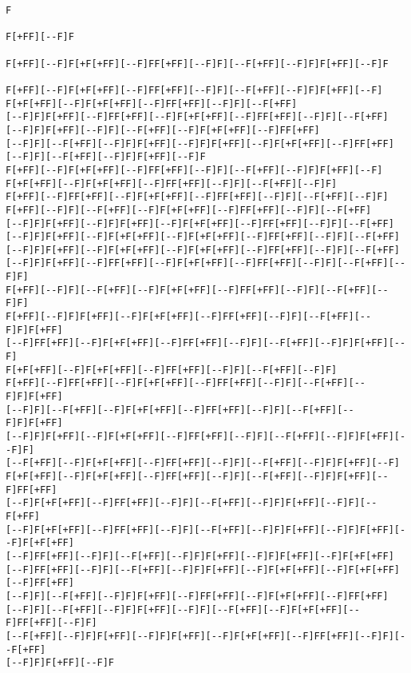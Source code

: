 \documentclass[
]{article}
\begin{document}
\begin{verbatim}
F

F[+FF][--F]F

F[+FF][--F]F[+F[+FF][--F]FF[+FF][--F]F][--F[+FF][--F]F]F[+FF][--F]F

F[+FF][--F]F[+F[+FF][--F]FF[+FF][--F]F][--F[+FF][--F]F]F[+FF][--F]
F[+F[+FF][--F]F[+F[+FF][--F]FF[+FF][--F]F][--F[+FF] 
[--F]F]F[+FF][--F]FF[+FF][--F]F[+F[+FF][--F]FF[+FF][--F]F][--F[+FF]
[--F]F]F[+FF][--F]F][--F[+FF][--F]F[+F[+FF][--F]FF[+FF]
[--F]F][--F[+FF][--F]F]F[+FF][--F]F]F[+FF][--F]F[+F[+FF][--F]FF[+FF]
[--F]F][--F[+FF][--F]F]F[+FF][--F]F 
F[+FF][--F]F[+F[+FF][--F]FF[+FF][--F]F][--F[+FF][--F]F]F[+FF][--F]
F[+F[+FF][--F]F[+F[+FF][--F]FF[+FF][--F]F][--F[+FF][--F]F] 
F[+FF][--F]FF[+FF][--F]F[+F[+FF][--F]FF[+FF][--F]F][--F[+FF][--F]F]
F[+FF][--F]F][--F[+FF][--F]F[+F[+FF][--F]FF[+FF][--F]F][--F[+FF] 
[--F]F]F[+FF][--F]F]F[+FF][--F]F[+F[+FF][--F]FF[+FF][--F]F][--F[+FF]
[--F]F]F[+FF][--F]F[+F[+FF][--F]F[+F[+FF][--F]FF[+FF][--F]F][--F[+FF] 
[--F]F]F[+FF][--F]F[+F[+FF][--F]F[+F[+FF][--F]FF[+FF][--F]F][--F[+FF]
[--F]F]F[+FF][--F]FF[+FF][--F]F[+F[+FF][--F]FF[+FF][--F]F][--F[+FF][--F]F] 
F[+FF][--F]F][--F[+FF][--F]F[+F[+FF][--F]FF[+FF][--F]F][--F[+FF][--F]F]
F[+FF][--F]F]F[+FF][--F]F[+F[+FF][--F]FF[+FF][--F]F][--F[+FF][--F]F]F[+FF] 
[--F]FF[+FF][--F]F[+F[+FF][--F]FF[+FF][--F]F][--F[+FF][--F]F]F[+FF][--F]
F[+F[+FF][--F]F[+F[+FF][--F]FF[+FF][--F]F][--F[+FF][--F]F] 
F[+FF][--F]FF[+FF][--F]F[+F[+FF][--F]FF[+FF][--F]F][--F[+FF][--F]F]F[+FF]
[--F]F][--F[+FF][--F]F[+F[+FF][--F]FF[+FF][--F]F][--F[+FF][--F]F]F[+FF] 
[--F]F]F[+FF][--F]F[+F[+FF][--F]FF[+FF][--F]F][--F[+FF][--F]F]F[+FF][--F]F]
[--F[+FF][--F]F[+F[+FF][--F]FF[+FF][--F]F][--F[+FF][--F]F]F[+FF][--F]
F[+F[+FF][--F]F[+F[+FF][--F]FF[+FF][--F]F][--F[+FF][--F]F]F[+FF][--F]FF[+FF]
[--F]F[+F[+FF][--F]FF[+FF][--F]F][--F[+FF][--F]F]F[+FF][--F]F][--F[+FF] 
[--F]F[+F[+FF][--F]FF[+FF][--F]F][--F[+FF][--F]F]F[+FF][--F]F]F[+FF][--F]F[+F[+FF]
[--F]FF[+FF][--F]F][--F[+FF][--F]F]F[+FF][--F]F]F[+FF][--F]F[+F[+FF] 
[--F]FF[+FF][--F]F][--F[+FF][--F]F]F[+FF][--F]F[+F[+FF][--F]F[+F[+FF][--F]FF[+FF]
[--F]F][--F[+FF][--F]F]F[+FF][--F]FF[+FF][--F]F[+F[+FF][--F]FF[+FF] 
[--F]F][--F[+FF][--F]F]F[+FF][--F]F][--F[+FF][--F]F[+F[+FF][--F]FF[+FF][--F]F]
[--F[+FF][--F]F]F[+FF][--F]F]F[+FF][--F]F[+F[+FF][--F]FF[+FF][--F]F][--F[+FF]
[--F]F]F[+FF][--F]F
\end{verbatim}
\end{document}

